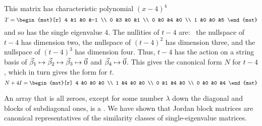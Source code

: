 \begin{example}
This matrix has characteristic polynomial \( (x-4)^4 \) 
\begin{equation*}
  T=
  \begin{mat}[r]
    4  &1  &0  &-1  \\
    0  &3  &0  &1   \\
    0  &0  &4  &0   \\
    1  &0  &0  &5
   \end{mat}
\end{equation*}
and so has the single eigenvalue $4$.
The nullities of $t-4$ are:~
the nullspace of $t-4$ has dimension two, the nullspace of $(t-4)^2$
has dimension three, and the nullspace of $(t-4)^3$ has dimension four.
Thus, $t-4$ has the action on a string basis of
$\vec{\beta}_1\mapsto\vec{\beta}_2\mapsto\vec{\beta}_3\mapsto\vec{0}$ and
$\vec{\beta}_4\mapsto\vec{0}$.
This gives the canonical form $N$ for $t-4$, which in turn gives the
form for \( t \).
\begin{equation*}
  N+4I=
  \begin{mat}[r]
    4  &0  &0  &0   \\
    1  &4  &0  &0   \\
    0  &1  &4  &0   \\
    0  &0  &0  &4
   \end{mat}
\end{equation*}
\end{example}

An array that is all zeroes, except for some number $\lambda$
down the diagonal and blocks of subdiagonal ones, is a 
.
We have shown that Jordan block matrices are
canonical representatives of the similarity classes of single-eigenvalue
matrices.

